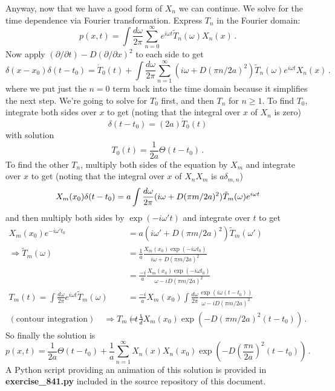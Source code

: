 Anyway, now that we have a good form of $X_n$ we can continue.
We solve for the time dependence via Fourier transformation.
Express $T_n$ in the Fourier domain:
\begin{equation*}
  p(x, t)
  = \int \frac{d\omega}{2\pi} \sum_{n=0}^\infty
    e^{i \omega t} \tilde{T}_n(\omega) X_n(x)
  \, .
\end{equation*}
Now apply $(\partial / \partial t) - D (\partial / \partial x)^2$ to each side to get
\begin{equation*}
  \delta(x - x_0) \delta(t - t_0)
    = \dot{T}_0(t) + \int \frac{d \omega}{2\pi}
    \sum_{n=1}^\infty (i \omega + D (\pi n / 2a)^2)
    \tilde{T}_n(\omega) e^{i \omega t}
    X_n(x)
  \, .
\end{equation*}
where we put just the $n=0$ term back into the time domain because it simplifies the next step.
We're going to solve for $T_0$ first, and then $T_n$ for $n \geq 1$.
To find $T_0$, integrate both sides over $x$ to get (noting that the integral over $x$ of $X_n$ is zero)
\begin{equation*}
  \delta(t - t_0) = (2 a) \dot{T}_0(t)
\end{equation*}
with solution
\begin{equation*}
  T_0(t) = \frac{1}{2 a} \Theta(t - t_0)
  \, .
\end{equation*}
To find the other $T_n$, multiply both sides of the equation by $X_m$ and integrate over $x$ to get (noting that the integral over $x$ of $X_n X_m$ is $a \delta_{m, n}$)
\begin{equation*}
  X_m(x_0) \delta(t - t_0)
  = a \int \frac{d\omega}{2\pi} (i\omega + D(\pi m / 2a)^2) \tilde{T}_m(\omega) e^{i \omega t} \\
\end{equation*}
and then multiply both sides by $\exp(-i \omega' t)$ and integrate over $t$ to get
\begin{align*}
  X_m(x_0) e^{-i \omega' t_0}
  &= a (i \omega' + D(\pi m / 2 a)^2) \tilde{T}_m(\omega') \\
  \Rightarrow \tilde{T}_m(\omega)
  &= \frac{1}{a} \frac{X_m(x_0) \exp(-i \omega t_0)}{i \omega + D (\pi m / 2 a)^2} \\
  &= \frac{-i}{a} \frac{X_m(x_0) \exp(-i \omega t_0)}{\omega - i D (\pi m / 2 a)^2} \\
  T_m(t) = \int \frac{d\omega}{2\pi} e^{i \omega t} \tilde{T}_m(\omega)
  &= \frac{-i}{a} X_m(x_0) \int \frac{d\omega}{2\pi} \frac{\exp(i \omega (t - t_0))}{\omega - i D (\pi m / 2 a)^2} \\
  (\text{contour integration}) \quad \Rightarrow
  T_m(t) &= \frac{1}{a} X_m(x_0) \exp \left( -D (\pi m / 2 a)^2 (t - t_0) \right)
  \, .
\end{align*}
So finally the solution is
\begin{equation*}
  p(x, t) = \frac{1}{2a} \Theta(t - t_0)
  + \frac{1}{a} \sum_{n=1}^\infty X_n(x) X_n(x_0) \exp \left( -D \left( \frac{\pi n}{2 a} \right)^2 (t - t_0) \right)
  \, .
\end{equation*}
A Python script providing an animation of this solution is provided in \textbf{exercise\_841.py} included in the source repository of this document.
